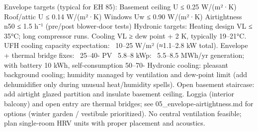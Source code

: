 {}\markdownRendererUlBeginTight
\markdownRendererUlItem Envelope targets (typical for EH 85):\markdownRendererUlItemEnd 
\markdownRendererUlItem Basement ceiling U ≤ 0.25 W/(m²·K)\markdownRendererUlItemEnd 
\markdownRendererUlItem Roof/attic U ≤ 0.14 W/(m²·K)\markdownRendererUlItemEnd 
\markdownRendererUlItem Windows Uw ≤ 0.90 W/(m²·K)\markdownRendererUlItemEnd 
\markdownRendererUlItem Airtightness n50 ≤ 1.5 h⁻¹ (pre/post blower‑door tests)\markdownRendererUlItemEnd 
\markdownRendererUlItem Hydronic targets:\markdownRendererUlItemEnd 
\markdownRendererUlItem Heating design VL ≤ 35°C; long compressor runs.\markdownRendererUlItemEnd 
\markdownRendererUlItem Cooling VL ≥ dew point + 2 K, typically 19–21°C.\markdownRendererUlItemEnd 
\markdownRendererUlItem UFH cooling capacity expectation: ~10–25 W/m² (≈1.1–2.8 kW total).\markdownRendererUlItemEnd 
\markdownRendererUlEndTight \markdownRendererInterblockSeparator
{}
\markdownRendererSectionEnd \markdownRendererSectionBegin
{}\markdownRendererInterblockSeparator
{}\markdownRendererUlBeginTight
\markdownRendererUlItem Envelope + thermal bridge fixes: ~25–40- PV ~5.8–8 kWp: ~5.5–8.5 MWh/yr generation; with battery 10 kWh, self‑consumption 50–70- Hydronic cooling: pleasant background cooling; humidity managed by ventilation and dew‑point limit (add dehumidifier only during unusual heat/humidity spells).\markdownRendererUlItemEnd 
\markdownRendererUlEndTight \markdownRendererInterblockSeparator
{}
\markdownRendererSectionEnd \markdownRendererSectionBegin
{}\markdownRendererInterblockSeparator
{}\markdownRendererUlBeginTight
\markdownRendererUlItem Open basement staircase: add airtight glazed partition and insulate basement ceiling.\markdownRendererUlItemEnd 
\markdownRendererUlItem Loggia (interior balcony) and open entry are thermal bridges; see 05_envelope‑airtightness.md for options (winter garden / vestibule prioritized).\markdownRendererUlItemEnd 
\markdownRendererUlItem No central ventilation feasible; plan single‑room HRV units with proper placement and acoustics.\markdownRendererUlItemEnd 
\markdownRendererUlEndTight 
\markdownRendererSectionEnd 
\markdownRendererSectionEnd \markdownRendererDocumentEnd